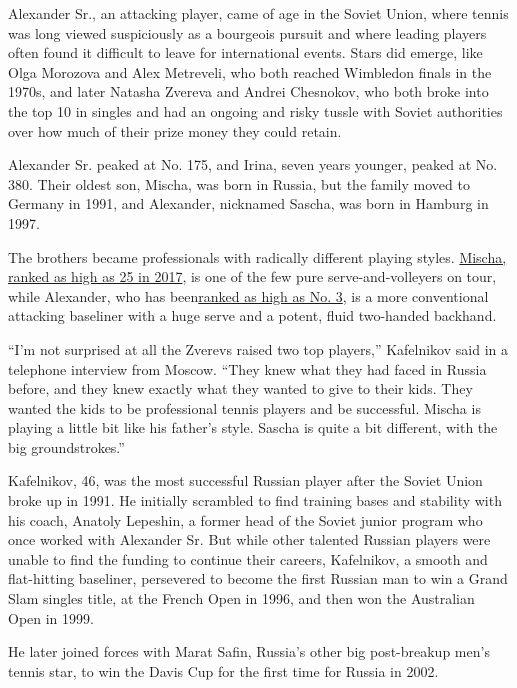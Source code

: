 Alexander Sr., an attacking player, came of age in the Soviet Union,
where tennis was long viewed suspiciously as a bourgeois pursuit and
where leading players often found it difficult to leave for
international events. Stars did emerge, like Olga Morozova and Alex
Metreveli, who both reached Wimbledon finals in the 1970s, and later
Natasha Zvereva and Andrei Chesnokov, who both broke into the top 10 in
singles and had an ongoing and risky tussle with Soviet authorities over
how much of their prize money they could retain.

Alexander Sr. peaked at No. 175, and Irina, seven years younger, peaked
at No. 380. Their oldest son, Mischa, was born in Russia, but the family
moved to Germany in 1991, and Alexander, nicknamed Sascha, was born in
Hamburg in 1997.

The brothers became professionals with radically different playing
styles.
\href{https://www.atptour.com/en/players/mischa-zverev/z168/overview}{Mischa,
ranked as high as 25 in 2017}, is one of the few pure
serve-and-volleyers on tour, while Alexander, who has
been\href{https://www.atptour.com/en/players/alexander-zverev/z355/overview}{ranked
as high as No. 3}, is a more conventional attacking baseliner with a
huge serve and a potent, fluid two-handed backhand.

``I'm not surprised at all the Zverevs raised two top players,''
Kafelnikov said in a telephone interview from Moscow. ``They knew what
they had faced in Russia before, and they knew exactly what they wanted
to give to their kids. They wanted the kids to be professional tennis
players and be successful. Mischa is playing a little bit like his
father's style. Sascha is quite a bit different, with the big
groundstrokes.''

Kafelnikov, 46, was the most successful Russian player after the Soviet
Union broke up in 1991. He initially scrambled to find training bases
and stability with his coach, Anatoly Lepeshin, a former head of the
Soviet junior program who once worked with Alexander Sr. But while other
talented Russian players were unable to find the funding to continue
their careers, Kafelnikov, a smooth and flat-hitting baseliner,
persevered to become the first Russian man to win a Grand Slam singles
title, at the French Open in 1996, and then won the Australian Open in
1999.

He later joined forces with Marat Safin, Russia's other big post-breakup
men's tennis star, to win the Davis Cup for the first time for Russia in
2002.

